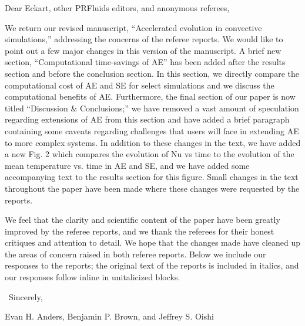 \documentclass[aps, 11pt, singlecolumn]{revtex4-1} %
\begin{document}
\newenvironment{myquotation}{
\begin{quotation}
\itshape
}{ 
\end{quotation}
}
\noindent
Dear Eckart, other PRFluids editors, and anonymous referees,
$\,$\newline

\begin{singlespace}
We return our revised manuscript, ``Accelerated evolution in
convective simulations,'' addressing the concerns of the referee reports.
We would like to point out a few major changes in this version of the manuscript.
A brief new section, ``Computational time-savings of AE'' has been added after the
results section and before the conclusion section. In this section, we directly
compare the computational cost of AE and SE for select simulations and we discuss
the computational benefits of AE.  Furthermore, the final section of our paper
is now titled ``Discussion \& Conclusions;'' we have removed a vast amount
of speculation regarding extensions of AE from this section and have added
a brief paragraph containing some caveats regarding challenges that users will face in
extending AE to more complex systems.  In addition to these changes in the text,
we have added a new Fig. 2 which compares the evolution of Nu vs time to the
evolution of the
mean temperature vs. time in AE and SE, 
and we have added some accompanying text to the results section for this
figure.  Small changes in the text throughout the paper have
been made where these changes were requested by the reports.

We feel that the clarity and scientific content of the paper have been greatly
improved by the referee reports, and we thank the referees for their honest 
critiques and attention to detail. We hope that the changes made have
cleaned up the areas of concern raised in both referee reports.  Below we
include our responses to the reports; the original text of the reports is included
in italics, and our responses follow inline in unitalicized blocks.

$\,$\newline
\noindent
Sincerely,

Evan H. Anders, Benjamin P. Brown, and Jeffrey S. Oishi





\end{singlespace}
\end{document}
